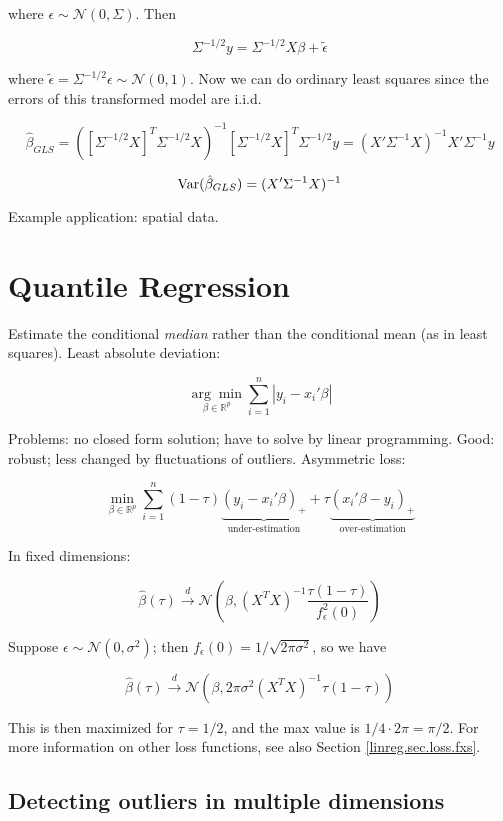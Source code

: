 where \(\epsilon \sim \mathcal{N}(0, \Sigma)\). Then 

\[
\Sigma^{-1/2} y = \Sigma^{-1/2} X \beta + \tilde{\epsilon}
\]

where \(\tilde{\epsilon} =  \Sigma^{-1/2} \epsilon \sim \mathcal{N}(0,1)\). Now we can do ordinary least squares since the errors of this transformed model are i.i.d.

\[
\hat{\beta}_{GLS}=  \left( \left[  \Sigma^{-1/2} X \right]^T  \Sigma^{-1/2} X \right)^{-1} \left[  \Sigma^{-1/2} X \right] ^T \Sigma^{-1/2} y = (X' \Sigma^{-1}X)^{-1}X' \Sigma^{-1}y 
\]

\[
\Var(\hat{\beta}_{GLS}) = (X' \Sigma^{-1} X)^{-1}
\]

Example application: spatial data. 

\section{Quantile Regression}\label{linreg.sec.quant.reg}

Estimate the conditional \textit{median} rather than the conditional mean (as in least squares). Least absolute deviation:

\[
\underset{\beta \in \mathbb{R}^{p}}{\arg \min} \sum_{i=1}^n \left| y_i - x_i' \beta \right| 
\]

Problems: no closed form solution; have to solve by linear programming. Good: robust; less changed by fluctuations of outliers. Asymmetric loss:

\[
\underset{\beta \in \mathbb{R}^p}{\min} \sum_{i=1}^n (1 - \tau)  \underbrace{(y_i - x_i' \beta)_+}_{\text{under-estimation}} + \tau \underbrace{ (x_i' \beta - y_i)_+}_{\text{over-estimation}} 
\]

In fixed dimensions: 

\[
\hat{\beta}(\tau) \xrightarrow{d} \mathcal{N} \left(\beta, (X^TX)^{-1} \frac{ \tau(1-\tau)}{ f_\epsilon^2(0)} \right)
\]

Suppose \(\epsilon \sim \mathcal{N}(0,\sigma^2)\); then \(f_\epsilon(0) = 1/ \sqrt{2 \pi \sigma^2}\), so we have 

\[
\hat{\beta}(\tau) \xrightarrow{d} \mathcal{N} \left(\beta, 2 \pi \sigma^2(X^TX)^{-1}  \tau(1 - \tau)  \right)
\]

This is then maximized for \(\tau = 1/2\), and the max value is \(1/4 \cdot 2 \pi = \pi/2\). For more information on other loss functions, see also Section \ref{linreg.sec.loss.fxs}.

\subsection{Detecting outliers in multiple dimensions}

